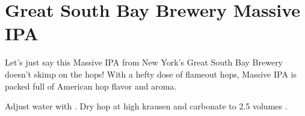 \documentclass[10pt,oneside]{scrbook}
\begin{document}
\pagebreak

\begin{ingredientsblock}

\begin{malts}
\end{malts}

\begin{hops}
\end{hops}

\begin{yeasts}
\end{yeasts}

\end{ingredientsblock}

\chapter*{Great South Bay Brewery Massive IPA}

\begin{aboutblock}
Let's just say this Massive IPA from New York's Great South Bay Brewery doesn't skimp on
the hops! With a hefty dose of flameout hops, Massive IPA is packed full of American hop
flavor and aroma.
\end{aboutblock}


\begin{methodandtiming}
 
\begin{mashsteps}
\end{mashsteps}

\begin{directions}
Adjust water with  . Dry hop at high krausen and carbonate to 2.5 volumes .
\end{directions}

\end{methodandtiming}

\pagebreak
\end{document}
